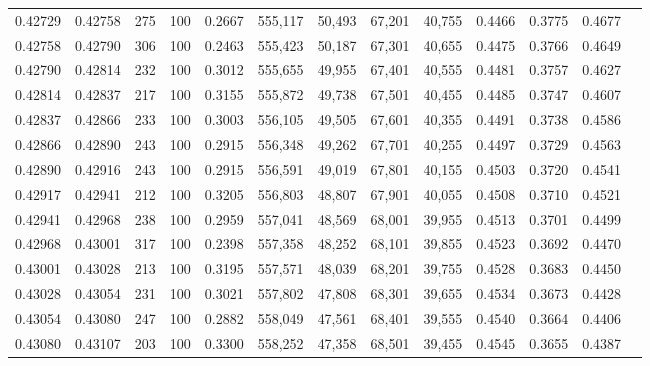 \begin{tabular}{rrrrrrrrrrrrr}
0.42729 & 0.42758 &    275 & 100 &                                     0.2667 & 555,117 &  50,493 &  67,201 &  40,755 & 0.4466 & 0.3775 & 0.4677 \\
0.42758 & 0.42790 &    306 & 100 &                                     0.2463 & 555,423 &  50,187 &  67,301 &  40,655 & 0.4475 & 0.3766 & 0.4649 \\
0.42790 & 0.42814 &    232 & 100 &                                     0.3012 & 555,655 &  49,955 &  67,401 &  40,555 & 0.4481 & 0.3757 & 0.4627 \\
0.42814 & 0.42837 &    217 & 100 &                                     0.3155 & 555,872 &  49,738 &  67,501 &  40,455 & 0.4485 & 0.3747 & 0.4607 \\
0.42837 & 0.42866 &    233 & 100 &                                     0.3003 & 556,105 &  49,505 &  67,601 &  40,355 & 0.4491 & 0.3738 & 0.4586 \\
0.42866 & 0.42890 &    243 & 100 &                                     0.2915 & 556,348 &  49,262 &  67,701 &  40,255 & 0.4497 & 0.3729 & 0.4563 \\
0.42890 & 0.42916 &    243 & 100 &                                     0.2915 & 556,591 &  49,019 &  67,801 &  40,155 & 0.4503 & 0.3720 & 0.4541 \\
0.42917 & 0.42941 &    212 & 100 &                                     0.3205 & 556,803 &  48,807 &  67,901 &  40,055 & 0.4508 & 0.3710 & 0.4521 \\
0.42941 & 0.42968 &    238 & 100 &                                     0.2959 & 557,041 &  48,569 &  68,001 &  39,955 & 0.4513 & 0.3701 & 0.4499 \\
0.42968 & 0.43001 &    317 & 100 &                                     0.2398 & 557,358 &  48,252 &  68,101 &  39,855 & 0.4523 & 0.3692 & 0.4470 \\
0.43001 & 0.43028 &    213 & 100 &                                     0.3195 & 557,571 &  48,039 &  68,201 &  39,755 & 0.4528 & 0.3683 & 0.4450 \\
0.43028 & 0.43054 &    231 & 100 &                                     0.3021 & 557,802 &  47,808 &  68,301 &  39,655 & 0.4534 & 0.3673 & 0.4428 \\
0.43054 & 0.43080 &    247 & 100 &                                     0.2882 & 558,049 &  47,561 &  68,401 &  39,555 & 0.4540 & 0.3664 & 0.4406 \\
0.43080 & 0.43107 &    203 & 100 &                                     0.3300 & 558,252 &  47,358 &  68,501 &  39,455 & 0.4545 & 0.3655 & 0.4387 \\

\end{tabular}
